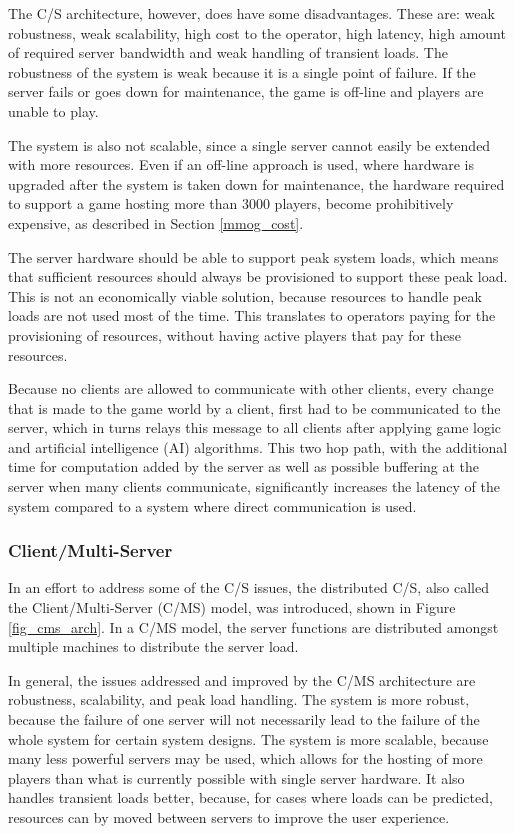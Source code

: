 The C/S architecture, however, does have some disadvantages. These are: weak robustness, weak scalability, high cost to the operator, high latency, high amount of required server bandwidth and weak handling of transient loads. The robustness of the system is weak because it is a single point of failure. If the server fails or goes down for maintenance, the game is off-line and players are unable to play.

The system is also not scalable, since a single server cannot easily be extended with more resources. Even if an off-line approach is used, where hardware is upgraded after the system is taken down for maintenance, the hardware required to support a game hosting more than 3000 players, become prohibitively expensive, as described in Section \ref{mmog_cost}.

The server hardware should be able to support peak system loads, which means that sufficient resources should always be provisioned to support these peak load. This is not an economically viable solution, because resources to handle peak loads are not used most of the time. This translates to operators paying for the provisioning of resources, without having active players that pay for these resources.

Because no clients are allowed to communicate with other clients, every change that is made to the game world by a client, first had to be communicated to the server, which in turns relays this message to all clients after applying game logic and artificial intelligence (AI) algorithms. This two hop path, with the additional time for computation added by the server as well as possible buffering at the server when many clients communicate, significantly increases the latency of the system compared to a system where direct communication is used.

\subsubsection{Client/Multi-Server}

In an effort to address some of the C/S issues, the distributed C/S, also called the Client/Multi-Server (C/MS) model, was introduced, shown in Figure \ref{fig_cms_arch}. In a C/MS model,
the server functions are distributed amongst multiple machines to distribute the server load.

In general, the issues addressed and improved by the C/MS architecture are robustness, scalability, and peak load handling. The system is more robust, because the failure of one server will not necessarily lead to the failure of the whole system for certain system designs. The system is more scalable, because many less powerful servers may be used, which allows for the hosting of more players than what is currently possible with single server hardware. It also handles transient loads better, because, for cases where loads can be predicted, resources can by moved between servers to improve the user experience.

